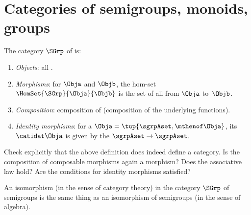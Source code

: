 
\section[Categories of semigroups, monoids, groups]{Categories of semigroups, monoids, groups}
\label{sec:cats-of-semigroups-monoids-groups}


\begin{ctdefinition}
    \label{def:SGrp}
    The category $\SGrp$ of  is:
    \begin{enumerate}
        \item \emph{Objects}: all .
        \item \emph{Morphisms}: for  $\Obja$ and $\Objb$, %
              the hom-set $\HomSet{\SGrp}{\Obja}{\Objb}$ is the set of all  from $\Obja$ to~$\Objb$.
        \item \emph{Composition}: composition of  (composition of the underlying functions).
        \item \emph{Identity morphisms}: for a  $\Obja = \tup{\sgrpAset, {{\mthenof \Obja}}}$, its  $\catidat\Obja$ is given by the  $\sgrpAset \to \sgrpAset$.
    \end{enumerate}
\end{ctdefinition}

\begin{gradedexercise}
    Check explicitly that the above definition does indeed define a category.
    Is the composition of composable morphisms again a morphism? Does the associative law hold? Are the conditions for identity morphisms satisfied?
\end{gradedexercise}


\begin{remark}
    An isomorphism (in the sense of category theory) in the category $\SGrp$ of semigroups is the same thing as an isomorphism of semigroups (in the sense of algebra).
\end{remark}

